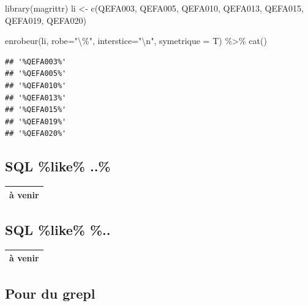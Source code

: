 \documentclass[
]{book}
\newenvironment{Shaded}{\begin{snugshade}}{\end{snugshade}}
\newcommand{\AttributeTok}[1]{\textcolor[rgb]{0.77,0.63,0.00}{#1}}
\newcommand{\FunctionTok}[1]{\textcolor[rgb]{0.00,0.00,0.00}{#1}}
\newcommand{\NormalTok}[1]{#1}
\newcommand{\OtherTok}[1]{\textcolor[rgb]{0.56,0.35,0.01}{#1}}
\newcommand{\SpecialCharTok}[1]{\textcolor[rgb]{0.00,0.00,0.00}{#1}}
\newcommand{\StringTok}[1]{\textcolor[rgb]{0.31,0.60,0.02}{#1}}
\begin{document}
\begin{Shaded}
\begin{Highlighting}[]
\FunctionTok{library}\NormalTok{(magrittr)}
\NormalTok{li }\OtherTok{\textless{}{-}} \FunctionTok{c}\NormalTok{(}\StringTok{\textquotesingle{}QEFA003\textquotesingle{}}\NormalTok{, }\StringTok{\textquotesingle{}QEFA005\textquotesingle{}}\NormalTok{, }\StringTok{\textquotesingle{}QEFA010\textquotesingle{}}\NormalTok{, }\StringTok{\textquotesingle{}QEFA013\textquotesingle{}}\NormalTok{, }\StringTok{\textquotesingle{}QEFA015\textquotesingle{}}\NormalTok{, }\StringTok{\textquotesingle{}QEFA019\textquotesingle{}}\NormalTok{, }\StringTok{\textquotesingle{}QEFA020\textquotesingle{}}\NormalTok{)}

\FunctionTok{enrobeur}\NormalTok{(li, }\AttributeTok{robe=}\StringTok{"}\SpecialCharTok{\textbackslash{}\textquotesingle{}}\StringTok{\%"}\NormalTok{, }\AttributeTok{interstice=}\StringTok{"}\SpecialCharTok{\textbackslash{}n}\StringTok{"}\NormalTok{, }\AttributeTok{symetrique =}\NormalTok{ T) }\SpecialCharTok{\%\textgreater{}\%} \FunctionTok{cat}\NormalTok{()}
\end{Highlighting}
\end{Shaded}

\begin{verbatim}
## '%QEFA003%'
## '%QEFA005%'
## '%QEFA010%'
## '%QEFA013%'
## '%QEFA015%'
## '%QEFA019%'
## '%QEFA020%'
\end{verbatim}

\hypertarget{sql-like-..}{%
\subsection{SQL \%like\% ..\%}\label{sql-like-..}}

\begin{longtable}[]{@{}l@{}}
\toprule
\endhead
à venir \\
\bottomrule
\end{longtable}

\hypertarget{sql-like-..-1}{%
\subsection{SQL \%like\% \%..}\label{sql-like-..-1}}

\begin{longtable}[]{@{}l@{}}
\toprule
\endhead
à venir \\
\bottomrule
\end{longtable}

\hypertarget{pour-du-grepl}{%
\subsection{Pour du grepl}\label{pour-du-grepl}}
\end{document}
